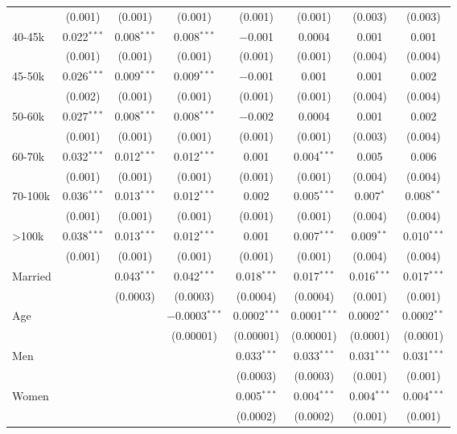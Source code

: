 \begin{table}[!htbp]
{\begin{tabular}{@{\extracolsep{5pt}}lccccccc}
  & (0.001) & (0.001) & (0.001) & (0.001) & (0.001) & (0.003) & (0.003) \\
  40-45k & 0.022$^{***}$ & 0.008$^{***}$ & 0.008$^{***}$ & $-$0.001 & 0.0004 & 0.001 & 0.001 \\
  & (0.001) & (0.001) & (0.001) & (0.001) & (0.001) & (0.004) & (0.004) \\
  45-50k & 0.026$^{***}$ & 0.009$^{***}$ & 0.009$^{***}$ & $-$0.001 & 0.001 & 0.001 & 0.002 \\
  & (0.002) & (0.001) & (0.001) & (0.001) & (0.001) & (0.004) & (0.004) \\
  50-60k & 0.027$^{***}$ & 0.008$^{***}$ & 0.008$^{***}$ & $-$0.002 & 0.0004 & 0.001 & 0.002 \\
  & (0.001) & (0.001) & (0.001) & (0.001) & (0.001) & (0.003) & (0.004) \\
  60-70k & 0.032$^{***}$ & 0.012$^{***}$ & 0.012$^{***}$ & 0.001 & 0.004$^{***}$ & 0.005 & 0.006 \\
  & (0.001) & (0.001) & (0.001) & (0.001) & (0.001) & (0.004) & (0.004) \\
  70-100k & 0.036$^{***}$ & 0.013$^{***}$ & 0.012$^{***}$ & 0.002 & 0.005$^{***}$ & 0.007$^{*}$ & 0.008$^{**}$ \\
  & (0.001) & (0.001) & (0.001) & (0.001) & (0.001) & (0.004) & (0.004) \\
  >100k & 0.038$^{***}$ & 0.013$^{***}$ & 0.012$^{***}$ & 0.001 & 0.007$^{***}$ & 0.009$^{**}$ & 0.010$^{***}$ \\
  & (0.001) & (0.001) & (0.001) & (0.001) & (0.001) & (0.004) & (0.004) \\
  Married &  & 0.043$^{***}$ & 0.042$^{***}$ & 0.018$^{***}$ & 0.017$^{***}$ & 0.016$^{***}$ & 0.017$^{***}$ \\
  &  & (0.0003) & (0.0003) & (0.0004) & (0.0004) & (0.001) & (0.001) \\
  Age &  &  & $-$0.0003$^{***}$ & 0.0002$^{***}$ & 0.0001$^{***}$ & 0.0002$^{**}$ & 0.0002$^{**}$ \\
  &  &  & (0.00001) & (0.00001) & (0.00001) & (0.0001) & (0.0001) \\
  Men &  &  &  & 0.033$^{***}$ & 0.033$^{***}$ & 0.031$^{***}$ & 0.031$^{***}$ \\
  &  &  &  & (0.0003) & (0.0003) & (0.001) & (0.001) \\
  Women &  &  &  & 0.005$^{***}$ & 0.004$^{***}$ & 0.004$^{***}$ & 0.004$^{***}$ \\
  &  &  &  & (0.0002) & (0.0002) & (0.001) & (0.001) \\

\end{tabular}}
\end{table}
